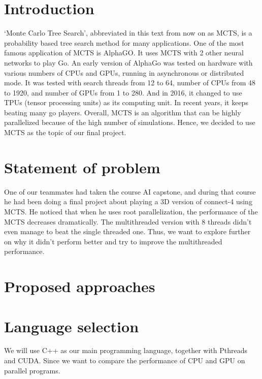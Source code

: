 \documentclass[sigconf]{acmart}
\begin{document}
\maketitle

\section{Introduction}
`Monte Carlo Tree Search', abbreviated in this text from now on as MCTS, is a probability based tree search method for many applications. 
One of the most famous application of MCTS is AlphaGO. It uses MCTS with 2 other neural networks to play Go. An early version of AlphaGo was tested on hardware with various numbers of CPUs and GPUs, running in asynchronous or distributed mode. It was tested with search threads from 12 to 64, number of CPUs from 48 to 1920, and number of GPUs from 1 to 280. And in 2016, it changed to use TPUs (tensor processing units) as its computing unit. In recent years, it keeps beating many go players. Overall, MCTS is an algorithm that can be highly parallelized because of the high number of simulations. Hence, we decided to use MCTS as the topic of our final project.

\section{Statement of problem}
One of our teammates had taken the course AI capstone, and during that course he had been doing a final project about playing a 3D version of connect-4 using MCTS. He noticed that when he uses root parallelization, the performance of the MCTS decreases dramatically. The multithreaded version with 8 threads didn’t even manage to beat the single threaded one. Thus, we want to explore further on why it didn’t perform better and try to improve the multithreaded performance. 

\section{Proposed approaches}

\section{Language selection}
We will use C++ as our main programming language, together with Pthreads and CUDA. Since we want to compare the performance of CPU and GPU on parallel programs.
\end{document}
